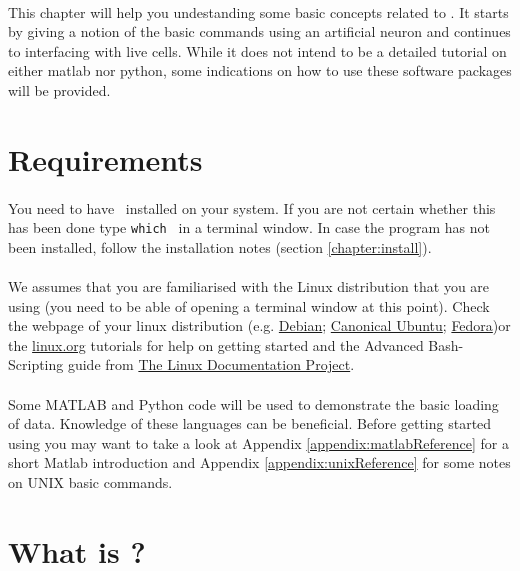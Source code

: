 \paragraph{}
This chapter will help you undestanding some basic concepts related to \progname. It starts by giving a notion of the basic commands using an artificial neuron and continues to interfacing with live cells. While it does not intend to be a detailed tutorial on either matlab nor python, some indications on how to use these software packages will be provided.

\section{Requirements}
\paragraph{}
You need to have \progname\ installed on your system. If you are not certain whether this has been done type \texttt{which \progname} in a terminal window. In case the program has not been installed, follow the installation notes (section \ref{chapter:install}).

\paragraph{}
We assumes that you are familiarised with the Linux distribution that you are using (you need to be able of opening a terminal window at this point). Check the webpage of your linux distribution (e.g. \href{http://www.debian.org}{Debian}; \href{http://www.ubuntu.com}{Canonical Ubuntu}; \href{http://www.fedoraproject.org}{Fedora})or the \href{http://www.linux.org/tutorial}{linux.org} tutorials for help on getting started and the Advanced Bash-Scripting guide from \href{http://www.tldp.org}{The Linux Documentation Project}.

\paragraph{}
Some MATLAB and Python code will be used to demonstrate the basic loading of data. Knowledge of these languages can be beneficial.
Before getting started using \texttt{\progname} you may want to take a look at Appendix \ref{appendix:matlabReference} for a short Matlab introduction and Appendix \ref{appendix:unixReference} for some notes on UNIX basic commands.

\section{What is \progname?}

